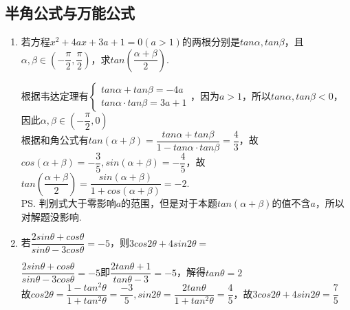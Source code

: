 \subsection*{半角公式与万能公式}
\begin{enumerate}
    \item 若方程$x^2+4ax+3a+1 = 0 (a>1)$的两根分别是$tan\alpha, tan\beta$，且$\alpha, \beta \in (-\dfrac{\pi}{2}, \dfrac{\pi}{2})$，求$tan(\dfrac{\alpha+\beta}{2})$.
    \begin{jieda}
        根据韦达定理有$\left \{ \begin{array}{l}
                tan\alpha + tan\beta = -4a  \\
                tan\alpha \cdot tan\beta = 3a+1 
        \end{array}\right.$，因为$a > 1$，所以$tan\alpha, tan\beta < 0$，因此$\alpha, \beta \in (-\dfrac{\pi}{2}, 0)$ \\
        根据和角公式有$tan(\alpha + \beta) = \dfrac{tan\alpha + tan\beta}{1 - tan\alpha \cdot tan\beta} = \dfrac{4}{3}$，故$cos(\alpha+\beta) = -\dfrac{3}{5}, sin(\alpha + \beta) = -\dfrac{4}{5}$，故$tan(\dfrac{\alpha+\beta}{2}) = \dfrac{sin(\alpha+\beta)}{1+cos(\alpha + \beta)} = -2$. \\
        \ps 判别式大于零影响$a$的范围，但是对于本题$tan(\alpha + \beta)$的值不含$a$，所以对解题没影响.
    \end{jieda}

    \item 若$\dfrac{2sin\theta + cos\theta}{sin\theta - 3cos\theta} = -5$，则$3cos2\theta + 4sin2\theta = $
    \begin{jieda}
        $\dfrac{2sin\theta + cos\theta}{sin\theta - 3cos\theta} = -5$即$\dfrac{2tan\theta + 1}{tan\theta - 3} = -5$，解得$tan\theta = 2$ \\
        故$cos2\theta = \dfrac{1-tan^2\theta}{1+tan^2\theta} = \dfrac{-3}{5}, sin2\theta = \dfrac{2tan\theta}{1+tan^2\theta} = \dfrac{4}{5}$，故$3cos2\theta + 4sin2\theta = \dfrac{7}{5}$
    \end{jieda}
\end{enumerate}

